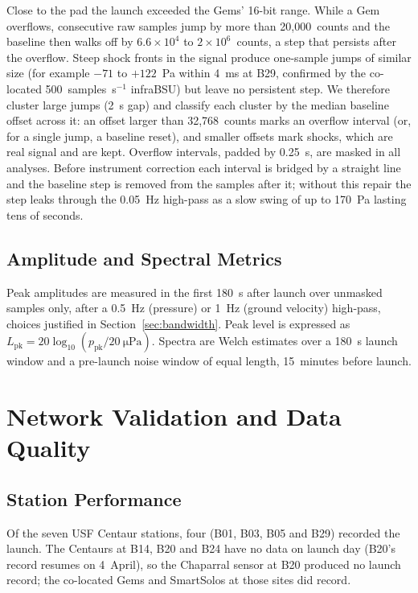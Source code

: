 \documentclass[]{seismica}
\begin{document}
Close to the pad the launch exceeded the Gems' 16-bit range. While a
Gem overflows, consecutive raw samples jump by more than 20{,}000~counts
and the baseline then walks off by $6.6\times10^{4}$ to
$2\times10^{6}$~counts, a step that persists after the overflow. Steep
shock fronts in the signal produce one-sample jumps of similar size
(for example $-71$ to $+122$~Pa within 4~ms at B29, confirmed by the
co-located 500~samples~s$^{-1}$ infraBSU) but leave no persistent step.
We therefore cluster large jumps (2~s gap) and classify each cluster by
the median baseline offset across it: an offset larger than
32{,}768~counts marks an overflow interval (or, for a single jump, a
baseline reset), and smaller offsets mark shocks, which are real signal
and are kept. Overflow intervals, padded by 0.25~s, are masked in all
analyses. Before instrument correction each interval is bridged by a
straight line and the baseline step is removed from the samples after
it; without this repair the step leaks through the 0.05~Hz high-pass as
a slow swing of up to 170~Pa lasting tens of seconds.

\subsection{Amplitude and Spectral Metrics}

Peak amplitudes are measured in the first 180~s after launch over
unmasked samples only, after a 0.5~Hz (pressure) or 1~Hz (ground
velocity) high-pass, choices justified in Section~\ref{sec:bandwidth}.
Peak level is expressed as $L_\text{pk} =
20\log_{10}(p_\text{pk}/\SI{20}{\micro\pascal})$. Spectra are Welch
estimates over a 180~s launch window and a pre-launch noise window of
equal length, 15~minutes before launch.


\section{Network Validation and Data Quality}
\label{sec:observations}

\subsection{Station Performance}
\label{sec:quality}

Of the seven USF Centaur stations, four (B01, B03, B05 and B29) recorded
the launch. The Centaurs at B14, B20 and B24 have no data on launch day
(B20's record resumes on 4~April), so the Chaparral sensor at B20
produced no launch record; the co-located Gems and SmartSolos at those
sites did record.
\end{document}
